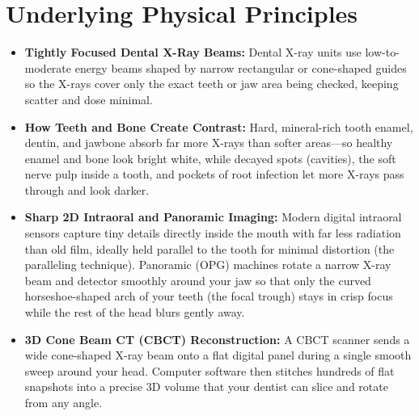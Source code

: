 \section{Underlying Physical Principles}
\begin{itemize}
\item \textbf{Tightly Focused Dental X-Ray Beams:} Dental X-ray units use low-to-moderate energy beams shaped by narrow rectangular or cone-shaped guides so the X-rays cover only the exact teeth or jaw area being checked, keeping scatter and dose minimal.
\item \textbf{How Teeth and Bone Create Contrast:} Hard, mineral-rich tooth enamel, dentin, and jawbone absorb far more X-rays than softer areas---so healthy enamel and bone look bright white, while decayed spots (cavities), the soft nerve pulp inside a tooth, and pockets of root infection let more X-rays pass through and look darker.
\item \textbf{Sharp 2D Intraoral and Panoramic Imaging:} Modern digital intraoral sensors capture tiny details directly inside the mouth with far less radiation than old film, ideally held parallel to the tooth for minimal distortion (the paralleling technique). Panoramic (OPG) machines rotate a narrow X-ray beam and detector smoothly around your jaw so that only the curved horseshoe-shaped arch of your teeth (the focal trough) stays in crisp focus while the rest of the head blurs gently away.
\item \textbf{3D Cone Beam CT (CBCT) Reconstruction:} A CBCT scanner sends a wide cone-shaped X-ray beam onto a flat digital panel during a single smooth sweep around your head. Computer software then stitches hundreds of flat snapshots into a precise 3D volume that your dentist can slice and rotate from any angle.
\end{itemize}

